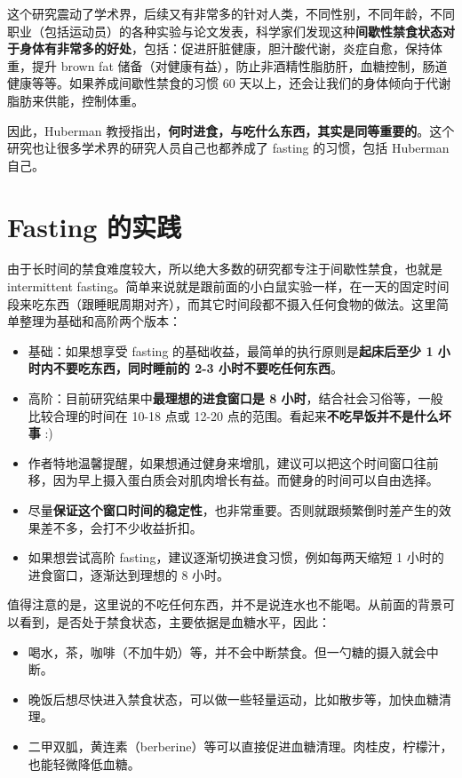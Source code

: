 \documentclass{report}
\begin{document}
这个研究震动了学术界，后续又有非常多的针对人类，不同性别，不同年龄，不同职业（包括运动员）的各种实验与论文发表，科学家们发现这种\textbf{间歇性禁食状态对于身体有非常多的好处}，包括：促进肝脏健康，胆汁酸代谢，炎症自愈，保持体重，提升 brown fat 储备（对健康有益），防止非酒精性脂肪肝，血糖控制，肠道健康等等。如果养成间歇性禁食的习惯 60 天以上，还会让我们的身体倾向于代谢脂肪来供能，控制体重。

因此，Huberman 教授指出，\textbf{何时进食，与吃什么东西，其实是同等重要的}。这个研究也让很多学术界的研究人员自己也都养成了 fasting 的习惯，包括 Huberman 自己。

\section{Fasting 的实践}

由于长时间的禁食难度较大，所以绝大多数的研究都专注于间歇性禁食，也就是 intermittent fasting。简单来说就是跟前面的小白鼠实验一样，在一天的固定时间段来吃东西（跟睡眠周期对齐），而其它时间段都不摄入任何食物的做法。这里简单整理为基础和高阶两个版本：

\begin{itemize}
    \item 基础：如果想享受 fasting 的基础收益，最简单的执行原则是\textbf{起床后至少 1 小时内不要吃东西，同时睡前的 2-3 小时不要吃任何东西}。
    \item 高阶：目前研究结果中\textbf{最理想的进食窗口是 8 小时}，结合社会习俗等，一般比较合理的时间在 10-18 点或 12-20 点的范围。看起来\textbf{不吃早饭并不是什么坏事} :)
    \item 作者特地温馨提醒，如果想通过健身来增肌，建议可以把这个时间窗口往前移，因为早上摄入蛋白质会对肌肉增长有益。而健身的时间可以自由选择。
    \item 尽量\textbf{保证这个窗口时间的稳定性}，也非常重要。否则就跟频繁倒时差产生的效果差不多，会打不少收益折扣。
    \item 如果想尝试高阶 fasting，建议逐渐切换进食习惯，例如每两天缩短 1 小时的进食窗口，逐渐达到理想的 8 小时。
\end{itemize}

值得注意的是，这里说的不吃任何东西，并不是说连水也不能喝。从前面的背景可以看到，是否处于禁食状态，主要依据是血糖水平，因此：

\begin{itemize}
    \item 喝水，茶，咖啡（不加牛奶）等，并不会中断禁食。但一勺糖的摄入就会中断。
    \item 晚饭后想尽快进入禁食状态，可以做一些轻量运动，比如散步等，加快血糖清理。
    \item 二甲双胍，黄连素（berberine）等可以直接促进血糖清理。肉桂皮，柠檬汁，也能轻微降低血糖。
\end{itemize}
\end{document}
